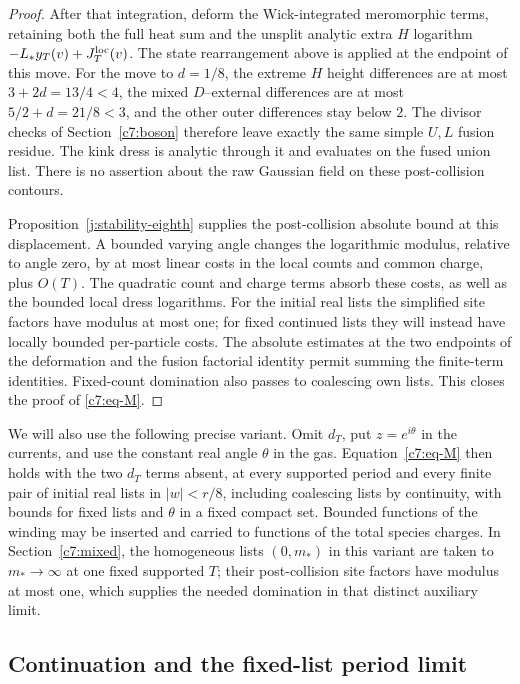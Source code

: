 \begin{proof}
After that integration, deform the Wick-integrated meromorphic
terms, retaining both the full heat sum and the unsplit analytic
extra $H$ logarithm $-L_*y_T(v)+J_T^{\rm loc}(v)$. The state
rearrangement above is applied at the endpoint of this move.
For the move to $d=1/8$,
the extreme $H$ height differences are at most
$3+2d=13/4<4$, the mixed $D$--external differences are at most
$5/2+d=21/8<3$, and the other outer differences stay below $2$.
The divisor checks of Section~\ref{c7:boson} therefore leave
exactly the same simple $U,L$ fusion residue. The kink dress is
analytic through it and evaluates on the fused union list.
There is no assertion about the raw Gaussian field on these
post-collision contours.

Proposition~\ref{j:stability-eighth} supplies the post-collision
absolute bound at this displacement. A bounded varying angle
changes the logarithmic modulus, relative to angle zero, by at
most linear costs in the local counts and common charge, plus
$O(T)$. The quadratic count and charge terms absorb these costs,
as well as the bounded local dress logarithms. For the initial
real lists the simplified site factors have modulus at most one;
for fixed continued lists they will instead have locally bounded
per-particle costs. The absolute estimates at the two endpoints
of the deformation and the fusion factorial identity permit
summing the finite-term identities. Fixed-count domination also
passes to coalescing own lists. This closes the proof of
\eqref{c7:eq-M}.
\end{proof}

We will also use the following precise variant. Omit $d_T$, put
$z=e^{i\theta}$ in the currents, and use the constant real angle
$\theta$ in the gas. Equation~\eqref{c7:eq-M} then holds with
the two $d_T$ terms absent, at every supported period and every
finite pair of initial real lists in $|w|<r/8$, including
coalescing lists by continuity, with bounds for fixed lists and
$\theta$ in a fixed compact set. Bounded functions of the winding
may be inserted and carried to functions of the total species
charges. In Section~\ref{c7:mixed}, the homogeneous lists
$(0,m_*)$ in this variant are taken to $m_*\to\infty$ at one
fixed supported $T$; their post-collision site factors have
modulus at most one, which supplies the needed domination in
that distinct auxiliary limit.

\subsection{Continuation and the fixed-list period limit}

